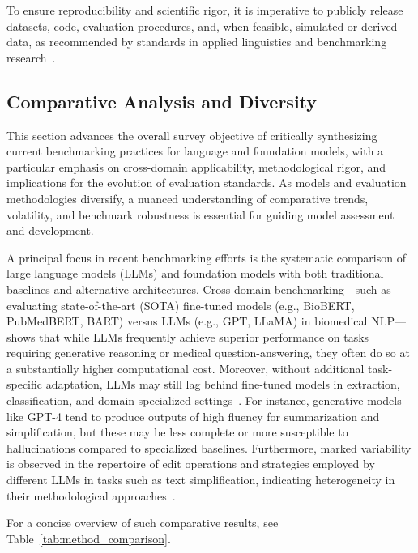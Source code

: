 \documentclass[sigconf]{acmart}
\begin{document}
To ensure reproducibility and scientific rigor, it is imperative to publicly release datasets, code, evaluation procedures, and, when feasible, simulated or derived data, as recommended by standards in applied linguistics and benchmarking research~\cite{ref108}.

\subsection{Comparative Analysis and Diversity}

This section advances the overall survey objective of critically synthesizing current benchmarking practices for language and foundation models, with a particular emphasis on cross-domain applicability, methodological rigor, and implications for the evolution of evaluation standards. As models and evaluation methodologies diversify, a nuanced understanding of comparative trends, volatility, and benchmark robustness is essential for guiding model assessment and development.

A principal focus in recent benchmarking efforts is the systematic comparison of large language models (LLMs) and foundation models with both traditional baselines and alternative architectures. Cross-domain benchmarking—such as evaluating state-of-the-art (SOTA) fine-tuned models (e.g., BioBERT, PubMedBERT, BART) versus LLMs (e.g., GPT, LLaMA) in biomedical NLP—shows that while LLMs frequently achieve superior performance on tasks requiring generative reasoning or medical question-answering, they often do so at a substantially higher computational cost. Moreover, without additional task-specific adaptation, LLMs may still lag behind fine-tuned models in extraction, classification, and domain-specialized settings~\cite{ref106}. For instance, generative models like GPT-4 tend to produce outputs of high fluency for summarization and simplification, but these may be less complete or more susceptible to hallucinations compared to specialized baselines. Furthermore, marked variability is observed in the repertoire of edit operations and strategies employed by different LLMs in tasks such as text simplification, indicating heterogeneity in their methodological approaches~\cite{ref106}.

For a concise overview of such comparative results, see Table~\ref{tab:method_comparison}.
\end{document}
